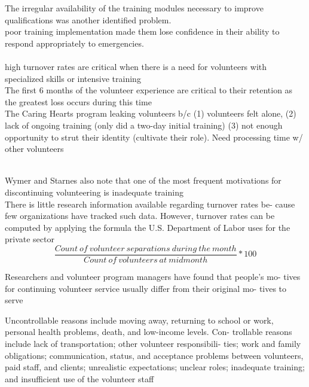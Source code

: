 \documentclass[11pt,fleqn]{book} %
\newcommand\ddfrac[2]{\frac{\displaystyle #1}{\displaystyle #2}}
\begin{document}
The irregular availability of the training modules
necessary to improve qualifications was another
identified problem.\\

poor training implementation made them lose confidence in
their ability to respond appropriately to emergencies.\\


\autocite{skoglund_not_2006}\\
high turnover rates are critical when there is a need for volunteers with specialized skills
or intensive training\\

The first 6 months of the volunteer experience are critical to their retention as the greatest loss occurs during this time\\

The Caring Hearts program leaking volunteers b/c (1) volunteers felt alone, (2) lack of ongoing training (only did a two-day initial training) (3) not enough opportunity to strut their identity (cultivate their role). Need processing time w/ other volunteers


\autocite{starnes_conceptual_2001}\\
Wymer and Starnes also note that one of the most frequent motivations for discontinuing volunteering is inadequate training\\

There is little research information available regarding turnover rates be-
cause few organizations have tracked such data. However, turnover rates can
be computed by applying the formula the U.S. Department of Labor uses for
the private sector
\begin{equation}
\ddfrac{Count \ of \ volunteer\ separations \ during \ the \ month}{Count\ of \ volunteers \ at \ midmonth} * 100
\end{equation}

Researchers and volunteer program managers have found that people’s mo-
tives for continuing volunteer service usually differ from their original mo-
tives to serve

Uncontrollable reasons include moving away, returning to
school or work, personal health problems, death, and low-income levels. Con-
trollable reasons include lack of transportation; other volunteer responsibili-
ties; work and family obligations; communication, status, and acceptance
problems between volunteers, paid staff, and clients; unrealistic expectations;
unclear roles; inadequate training; and insufficient use of the volunteer staff\\
\end{document}
